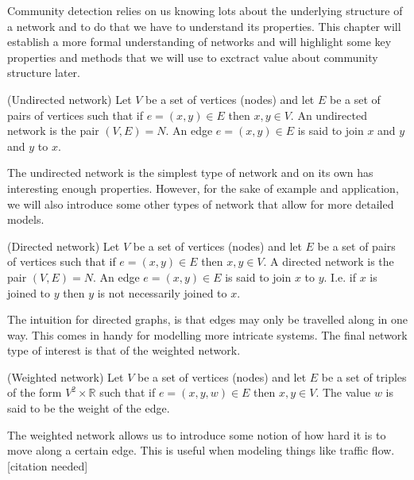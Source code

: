 Community detection relies on us knowing lots about the underlying structure of a network and to do that we have to understand its properties. This chapter will establish a more formal understanding of networks and will highlight some key properties and methods that we will use to exctract value about community structure later.

\begin{definition}{(Undirected network)}
    Let $V$ be a set of vertices (nodes) and let $E$ be a set of pairs of vertices such that if $e = (x, y) \in E$ then $x, y \in V$. An undirected network is the pair $(V, E) = N$. An edge $e = (x, y) \in E$ is said to join $x$ and $y$ and $y$ to $x$.\label{def:undirected_network}
\end{definition}

The undirected network is the simplest type of network and on its own has interesting enough properties. However, for the sake of example and application, we will also introduce some other types of network that allow for more detailed models.


\begin{definition}{(Directed network)}
    Let $V$ be a set of vertices (nodes) and let $E$ be a set of pairs of vertices such that if $e = (x, y) \in E$ then $x, y \in V$. A directed network is the pair $(V, E) = N$. An edge $e = (x, y) \in E$ is said to join $x$ to $y$. I.e. if $x$ is joined to $y$ then $y$ is not necessarily joined to $x$.\label{def:directed_network}
\end{definition}

The intuition for directed graphs, is that edges may only be travelled along in one way. This comes in handy for modelling more intricate systems. The final network type of interest is that of the weighted network.

\begin{definition}{(Weighted network)}
    Let $V$ be a set of vertices (nodes) and let $E$ be a set of triples of the form $V^2 \times \mathbb{R}$ such that if $e = (x, y, w) \in E$ then $x, y \in V$. The value $w$ is said to be the weight of the edge.\label{def:weighted_network}
\end{definition}

The weighted network allows us to introduce some notion of how hard it is to move along a certain edge. This is useful when modeling things like traffic flow. [citation needed]


